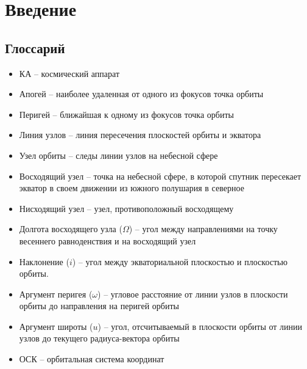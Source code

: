 \usetikzlibrary{calc}
\usetikzlibrary{intersections}
\usetikzlibrary{angles}
\usetikzlibrary{quotes}

\chapter{Введение}
\section{Глоссарий}
\begin{itemize}
  \item КА -- космический аппарат
  \item Апогей -- наиболее удаленная от одного из фокусов точка орбиты
  \item Перигей -- ближайшая к одному из фокусов точка орбиты
  \item Линия узлов -- линия пересечения плоскостей орбиты и экватора
  \item Узел орбиты -- следы линии узлов на небесной сфере
  \item Восходящий узел -- точка на небесной сфере, в которой спутник пересекает
  экватор в своем движении из южного полушария в северное
  \item Нисходящий узел -- узел, противоположный восходящему
  \item Долгота восходящего узла ($\Omega$) -- угол между направлениями на точку весеннего
  равноденствия и на восходящий узел
  \item Наклонение ($i$) -- угол между экваториальной плоскостью и плоскостью орбиты.
  \item Аргумент перигея ($\omega$) -- угловое расстояние от линии узлов в плоскости
  орбиты до направления на перигей орбиты
  \item Аргумент широты ($u$) -- угол, отсчитываемый в плоскости орбиты от линии
  узлов до текущего радиуса-вектора орбиты
  \item ОСК -- орбитальная система координат
\end{itemize}
